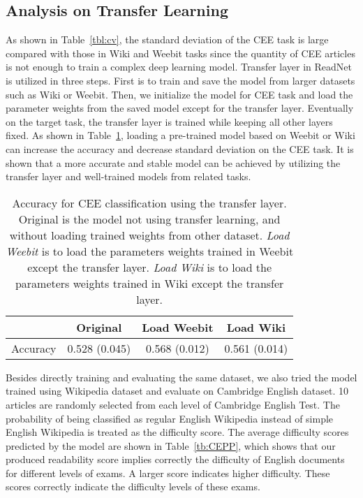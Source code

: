 \documentclass[runningheads]{llncs}
\begin{document}
\subsection{Analysis on Transfer Learning}
As shown in Table~\ref{tbl:cv}, the standard deviation of the CEE task is large compared with those in Wiki and Weebit tasks since the quantity of CEE articles is not enough to train a complex deep learning model. Transfer layer in ReadNet is utilized in three steps. First is to train and save the model from larger datasets such as Wiki or Weebit. Then, we initialize the model for CEE task and load the parameter weights from the saved model except for the transfer layer. Eventually on the target task, the transfer layer is trained while keeping all other layers fixed. As shown in Table~\ref{tb:transfer}, loading a pre-trained model based on Weebit or Wiki can increase the accuracy and decrease standard deviation on the CEE task. It is shown that a more accurate and stable model can be achieved by utilizing the transfer layer and well-trained models from related tasks.

\begin{table}[!h]
    \vspace{-0.5cm}
	\centering
	\small
	\begin{tabular}{c|c|c|c}
		
		 & Original & Load Weebit & Load Wiki \\
		\hline
		Accuracy & 0.528 (0.045) & 0.568 (0.012)& 0.561 (0.014)\\
		\hline
	\end{tabular}
	\caption{Accuracy for CEE classification using the transfer layer. Original is the model not using transfer learning, and without loading trained weights from other dataset. \emph{Load Weebit} is to load the parameters weights trained in Weebit except the transfer layer. \emph{Load Wiki} is to load the parameters weights trained in Wiki except the transfer layer. }\label{tb:transfer}
	\vspace{-1.0cm}
\end{table}




Besides directly training and evaluating the same dataset, we also tried the model trained using Wikipedia dataset and evaluate on Cambridge English dataset. 10 articles are randomly selected from each level of Cambridge English Test. The probability of being classified as regular English Wikipedia instead of simple English Wikipedia is treated as the  difficulty score. The average difficulty scores predicted by the model are shown in Table~\ref{tb:CEPP}, which shows that our produced readability score implies correctly the difficulty of English documents for different levels of exams. A larger score indicates higher difficulty. These scores correctly indicate the difficulty levels of these exams.
\end{document}
